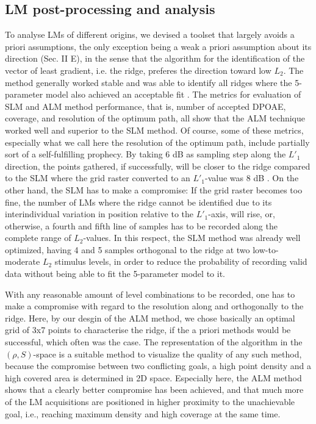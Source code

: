 \documentclass[journal,twoside,web]{ieeecolor2}
\begin{document}
\subsection{LM post-processing and analysis}
To analyse LMs of different origins, we devised a toolset that largely avoids a priori assumptions, the only exception being a weak a priori assumption about its direction (Sec. II E), in the sense that the algorithm for the identification of the vector of least gradient, i.e. the ridge, preferes the direction toward low $L_2$.
The method generally worked stable and was able to identify all ridges where the 5-parameter model also achieved an acceptable fit .
The metrics for evaluation of SLM and ALM method performance, that is, number of accepted DPOAE, coverage, and resolution of the optimum path, all show that the ALM technique worked well and superior to the SLM method.
Of course, some of these metrics, especially what we call here the resolution of the optimum path, include partially sort of a self-fulfilling prophecy.
By taking 6 dB as sampling step along the $L'_1$ direction, the points gathered, if successfully, will be closer to the ridge compared to the SLM where the grid raster converted to an $L'_1$-value was 8 dB .
On the other hand, the SLM has to make a compromise: If the grid raster becomes too fine, the number of LMs where the ridge cannot be identified due to its interindividual variation in position relative to the $L'_1$-axis, will rise, or, otherwise, a fourth and fifth line of samples has to be recorded along the complete range of $L_2$-values.
In this respect, the SLM method was already well optimized, having 4 and 5 samples orthogonal to the ridge at two low-to-moderate $L_2$ stimulus levels, in order to reduce the probability of recording valid data without being able to fit the 5-parameter model to it.

With any reasonable amount of  level combinations to be recorded, one has to make a compromise with regard to the resolution along and orthogonally to the ridge.
Here, by our desgin of the ALM method, we chose basically an optimal grid of 3x7 points to characterise the ridge, if the a priori methods would be successful, which often was the case.
The representation of the algorithm in the $(\rho, S)$-space is a suitable method to visualize the quality of any such method, because the compromise between two conflicting goals, a high point density and a high covered area is determined in 2D space.
Especially here, the ALM method shows that a clearly better compromise has been achieved, and that much more of the LM acquisitions are positioned in higher proximity to the unachievable goal, i.e., reaching maximum density and high coverage at the same time.
\end{document}
